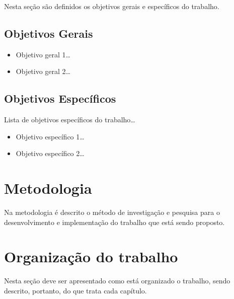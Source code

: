 Nesta seção são definidos os objetivos gerais e específicos do trabalho.

\subsection{Objetivos Gerais}

\begin{itemize}
  \item Objetivo geral 1\ldots
  \item Objetivo geral 2\ldots  
\end{itemize}

\subsection{Objetivos Específicos} 

Lista de objetivos específicos do trabalho\ldots

\begin{itemize}
  \item Objetivo específico 1\ldots
  \item Objetivo específico 2\ldots  
\end{itemize}

\section{Metodologia}

Na metodologia é descrito o método de investigação e pesquisa para o
desenvolvimento e implementação do trabalho que está sendo proposto.

\section{Organização do trabalho}

Nesta seção deve ser apresentado como está organizado o trabalho, sendo
descrito, portanto, do que trata cada capítulo.
